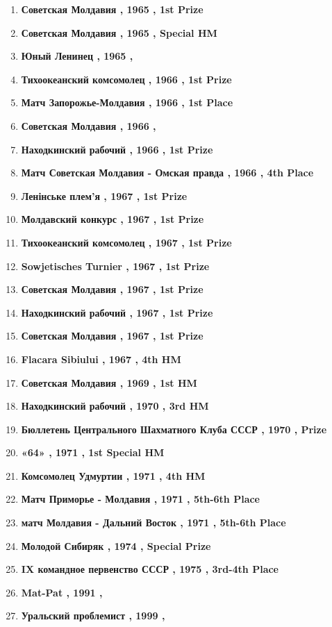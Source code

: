 \begin{enumerate}
\item  \textbf{ Советская Молдавия , 1965 , 1st Prize }
\item  \textbf{ Советская Молдавия , 1965 , Special HM }
\item  \textbf{ Юный Ленинец , 1965 , }
\item  \textbf{ Тихоокеанский комсомолец , 1966 , 1st Prize }
\item  \textbf{ Матч Запорожье-Молдавия , 1966 , 1st Place }
\item  \textbf{ Советская Молдавия , 1966 , }
\item  \textbf{ Находкинский рабочий , 1966 , 1st Prize }
\item  \textbf{ Матч Советская Молдавия - Омская правда , 1966 , 4th Place }
\item  \textbf{ Ленінське плем'я , 1967 , 1st Prize }
\item  \textbf{ Молдавский конкурс , 1967 , 1st Prize }
\item  \textbf{ Тихоокеанский комсомолец , 1967 , 1st Prize }
\item  \textbf{ Sowjetisches Turnier , 1967 , 1st Prize }
\item  \textbf{ Советская Молдавия , 1967 , 1st Prize }
\item  \textbf{ Находкинский рабочий , 1967 , 1st Prize }
\item  \textbf{ Советская Молдавия , 1967 , 1st Prize }
\item  \textbf{ Flacara Sibiului , 1967 , 4th HM }
\item  \textbf{ Советская Молдавия , 1969 , 1st HM }
\item  \textbf{ Находкинский рабочий , 1970 , 3rd HM }
\item  \textbf{ Бюллетень Центрального Шахматного Клуба СССР , 1970 , Prize }
\item  \textbf{ «64» , 1971 , 1st Special HM }
\item  \textbf{ Комсомолец Удмуртии , 1971 , 4th HM }
\item  \textbf{ Матч Приморье - Молдавия , 1971 , 5th-6th Place }
\item  \textbf{ матч Молдавия - Дальний Восток , 1971 , 5th-6th Place }
\item  \textbf{ Молодой Сибиряк , 1974 , Special Prize }
\item  \textbf{ IX командное первенство СССР , 1975 , 3rd-4th Place }
\item  \textbf{ Mat-Pat , 1991 , }
\item  \textbf{ Уральский проблемист , 1999 , }

\end{enumerate}
